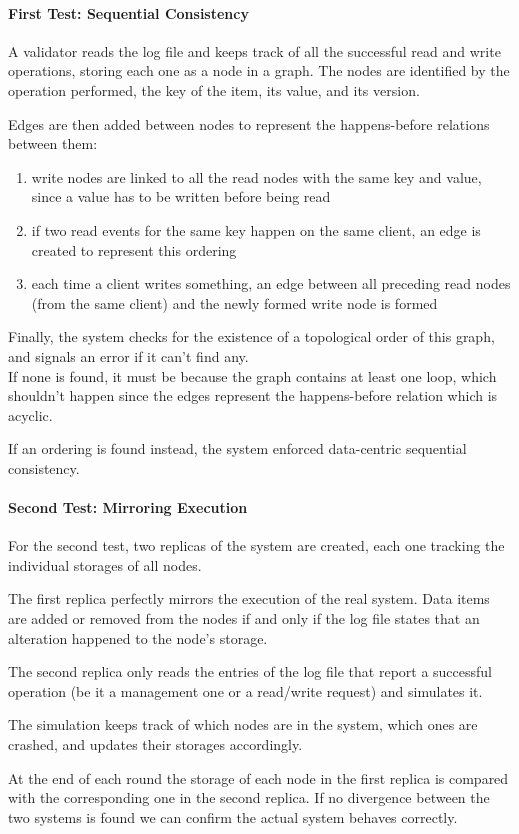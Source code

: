 \documentclass{article}
\begin{document}
\paragraph {First Test: Sequential Consistency}
A validator reads the log file and keeps track of all the successful read and write
operations, storing each one as a node in a graph. The nodes are identified
by the operation performed, the key of the item, its value, and its version.

Edges are then added between nodes to represent the happens-before relations 
between them:
\begin{enumerate}
    \item write nodes are linked to all the read nodes with the same key and 
    value, since
        a value has to be written before being read
    \item if two read events for the same key happen on the same client, an edge 
    is created
        to represent this ordering
    \item each time a client writes something, an edge between all preceding 
    read nodes (from the same client) and the
        newly formed write node is formed
\end{enumerate}
Finally, the system checks for the existence of a topological order of this 
graph, and signals an error if it can't find any.\\
If none is found, it must be because the graph contains at least one loop, which 
shouldn't happen since the edges
represent the happens-before relation which is acyclic.

If an ordering is found instead, the system enforced data-centric sequential 
consistency.

\paragraph {Second Test: Mirroring Execution}
For the second test, two replicas of the system are created, each one tracking
the individual storages of all nodes.

The first replica perfectly mirrors the execution of the real system. Data items
are added or removed from the nodes if and only if the log file states that an
alteration happened to the node's storage.

The second replica only reads the entries of the log file that report a
successful operation (be it a management one or a read/write request) and
simulates it.

The simulation keeps track of which nodes are in the system, which ones are
crashed, and updates their storages accordingly.

At the end of each round the storage of each node in the first replica is
compared with the corresponding one in the second replica. If no divergence
between the two systems is found we can confirm the actual system behaves
correctly.
\end{document}
